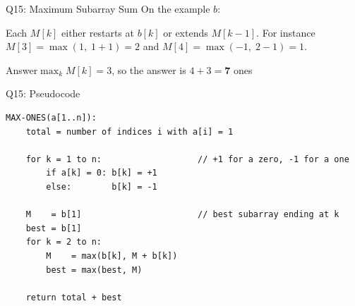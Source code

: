 \documentclass[10pt,aspectratio=169]{beamer}
\newcommand{\answer}[1]{\begin{alertblock}{Answer}#1\end{alertblock}}
\begin{document}
\begin{frame}{Q15: Maximum Subarray Sum}
  On the example $b$:

  \begin{center}
  \end{center}

  \bigskip
  Each $M[k]$ either restarts at $b[k]$ or extends $M[k-1]$. For instance
  $M[3] = \max(1,\; 1+1) = 2$ and $M[4] = \max(-1,\; 2-1) = 1$.

  \answer{$\max_k M[k] = 3$, so the answer is
          $4 + 3 = \mathbf{7}$ ones}
\end{frame}

\begin{frame}[fragile]{Q15: Pseudocode}
  \begin{lstlisting}[style=pc]
MAX-ONES(a[1..n]):
    total = number of indices i with a[i] = 1

    for k = 1 to n:                   // +1 for a zero, -1 for a one
        if a[k] = 0: b[k] = +1
        else:        b[k] = -1

    M    = b[1]                       // best subarray ending at k
    best = b[1]
    for k = 2 to n:
        M    = max(b[k], M + b[k])
        best = max(best, M)

    return total + best
  \end{lstlisting}
\end{frame}

\end{document}
